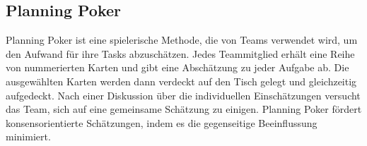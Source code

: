 \subsection{Planning Poker}\label{subsec:Planning-Poker}
Planning Poker ist eine spielerische Methode, die von Teams verwendet wird, um den Aufwand für ihre Tasks abzuschätzen.
Jedes Teammitglied erhält eine Reihe von nummerierten Karten und gibt eine Abschätzung zu jeder Aufgabe ab.
Die ausgewählten Karten werden dann verdeckt auf den Tisch gelegt und gleichzeitig aufgedeckt.
Nach einer Diskussion über die individuellen Einschätzungen versucht das Team, sich auf eine gemeinsame Schätzung zu einigen.
Planning Poker fördert konsensorientierte Schätzungen, indem es die gegenseitige Beeinflussung minimiert. 

\renewcommand{\kapitelautor}{}